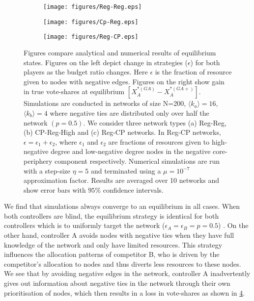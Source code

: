  \begin{figure}
 \centering
  \begin{subfigure}[b]{0.85\textwidth}
    \texttt{[image: figures/Reg-Reg.eps]}
    \caption{}
    \label{GT-1}
  \end{subfigure}
    \begin{subfigure}[b]{0.85\textwidth}
    \centering
    \texttt{[image: figures/Cp-Reg.eps]}
    \caption{}
    \label{GT-2}
  \end{subfigure}
      \begin{subfigure}[b]{0.85\textwidth}
    \centering
    \texttt{[image: figures/Reg-CP.eps]}
    \caption{}
    \label{GT-3}
  \end{subfigure}
  \caption{Figures compare analytical and numerical results of equilibrium states. Figures on the left depict change in strategies ($\epsilon$) for both players as the budget ratio changes. Here $\epsilon$ is the fraction of resource given to nodes with negative edges. Figures on the right show gain in true vote-shares at equilibrium $[X_{A}^{*(GA)} - X_{A}^{*(GA+)}]$. Simulations are conducted in networks of size N=200,  $\langle k_{a} \rangle = 16$, $\langle k_{b} \rangle = 4$ where negative ties are distributed only over half the network $(p=0.5)$. 
  We consider three network types (a) Reg-Reg, (b) CP-Reg-High and (c) Reg-CP networks. In Reg-CP networks, $\epsilon=\epsilon_{1}+\epsilon_{2}$, where $\epsilon_{1}$ and $\epsilon_{2}$ are fractions of resources given to high-negative degree and low-negative degree nodes in the negative core-periphery component respectively. Numerical simulations are run with a step-size $\eta=5$ and terminated using a $\mu=10^{-7}$ approximation factor. Results are averaged over 10 networks and show error bars with $95\%$ confidence intervals. }
  \label{GT}
\end{figure}
 

We find that simulations always converge to an equilibrium in all cases.
When both controllers are blind, the equilibrium strategy is identical for both controllers which is to uniformly target the network ($\epsilon_{A} = \epsilon_{B} = p = 0.5$) \cite{romero2021shadowing}. On the other hand, controller A avoids nodes with negative ties when they have full knowledge of the network and only have limited resources. This strategy influences the allocation patterns of competitor B, who is driven by the competitor's allocation to nodes and thus diverts less resources to these nodes. We see that by avoiding negative edges in the network, controller A inadvertently gives out information about negative ties in the network \textemdash through their own prioritisation of nodes, which then results in a loss in vote-shares as shown in \cref{GT}. 

